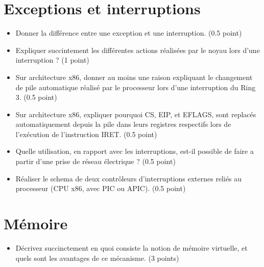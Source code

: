 \section{{Exceptions et interruptions}
         {\hfill{} }}
\begin{itemize}
  \item Donner la diff\'erence entre une exception et une interruption. (0.5 point)
  \item Expliquer succintement les diff\'erentes actions r\'ealis\'ees par le noyau lors d'une interruption ? (1 point)
  \item Sur architecture x86, donner au moins une raison expliquant le changement de pile automatique r\'ealis\'e par le processeur lors d'une interruption du Ring 3. (0.5 point)
  \item Sur architecture x86, expliquer pourquoi CS, EIP, et EFLAGS, sont replac\'es automatiquement depuis la pile dans leurs registres respectifs lors de l'ex\'ecution de l'instruction IRET. (0.5 point)
  \item Quelle utilisation, en rapport avec les interruptions, est-il possible de faire a partir d'une prise de r\'eseau \'electrique ? (0.5 point)
  \item R\'ealiser le schema de deux contr\^oleurs d'interruptions externes reli\'es au processeur (CPU x86, avec PIC ou APIC). (0.5 point)
\end{itemize}

\section{{M\'emoire}
         {\hfill{} }}

\begin{itemize}
  \item D\'ecrivez succinctement en quoi consiste la notion de m\'emoire virtuelle, et quels sont les avantages de ce m\'ecanisme. (3 points)
\end{itemize}

